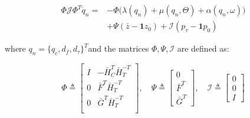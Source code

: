 %
%


\begin{equation}\label{eq:NonLinearModelWithTank}
	\begin{split}
		\Phi\mathcal{J}\Phi^T \dot{q}_n = &-\Phi\Big(\lambda(q_n)+\mu(q_n,\Theta)+\alpha(q_n,\omega)\Big)\\ 
		&+ \Psi(\bar{z}-\mathbf{1}z_0) + \mathcal{I}(p_{\tau}-\mathbf{1}p_0)
	\end{split}
\end{equation}

where $q_n = \{q_c, d_f, d_\tau\}^T$and the matrices $\Phi, \Psi, \mathcal{I}$ are defined as:

\begin{equation}\label{eq:NonLinearModelMatrices}
	\Phi \triangleq 
	\begin{bmatrix} 
		I & -\bar{H}_C^T\bar{H}_T^{-T} \\ 0 & \bar{F}^T\bar{H}_T^{-T} \\ 0  & \bar{G}^T\bar{H}_T^{-T} \\ 
	\end{bmatrix}
	, \quad
	\Psi \triangleq
	\begin{bmatrix}
		0 \\ \bar{F}^T \\ \bar{G}^T
	\end{bmatrix}
	, \quad
	\mathcal{I} \triangleq
	\begin{bmatrix}
		0 \\ 0 \\ I
	\end{bmatrix}
\end{equation}

